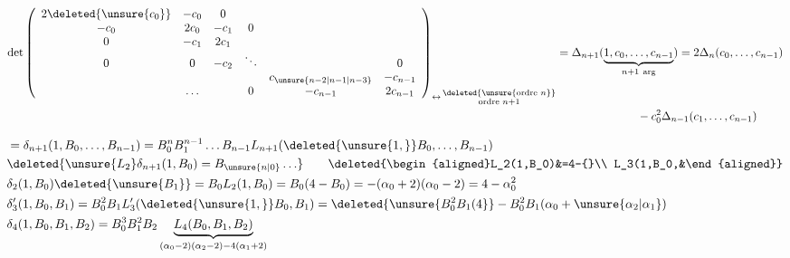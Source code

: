 \[
\begin{aligned}
\det\left(\begin{array}{cccccc}
2\deleted{\unsure{c_0}}&-c_0&0&&&\\
-c_0&2c_0&-c_1&0&&\\
0&-c_1&2c_1&&&\\
0&0&-c_2&\ddots&&0\\
&&&&c_{\unsure{n-2|n-1|n-3}}&-c_{n-1}\\
&\ldots&&0&-c_{n-1}&2c_{n-1}
\end{array}\right)_{\leftrightarrow\,\substack{\deleted{\unsure{\text{ordre }n}}\\\text{ordre }n+1}}
&=\Delta_{n+1}(\underbrace{1,c_0,\ldots,c_{n-1}}_{n+1\ \text{arg}})=2\Delta_n(c_0,\ldots,c_{n-1})\\
&\hspace{7em}-c_0^2\Delta_{n-1}(c_1,\ldots,c_{n-1})
\end{aligned}
\]

\[
\begin{aligned}
&=\delta_{n+1}(1,B_0,\ldots,B_{n-1})=B_0^n B_1^{n-1}\ldots B_{n-1}L_{n+1}(\deleted{\unsure{1,}}B_0,\ldots,B_{n-1})\\
&\deleted{\unsure{L_2}\delta_{n+1}(1,B_0)=B_{\unsure{n|0}}\ldots}
\qquad \deleted{\begin{aligned}L_2(1,B_0)&=4-{}\\ L_3(1,B_0,&\end{aligned}}\\
&\delta_2(1,B_0)\deleted{\unsure{B_1}}=B_0 L_2(1,B_0)=B_0(4-B_0)=-(\alpha_0+2)(\alpha_0-2)=4-\alpha_0^2\\
&\delta'_3(1,B_0,B_1)=B_0^2B_1L'_3(\deleted{\unsure{1,}}B_0,B_1)=\deleted{\unsure{B_0^2B_1(4}}-B_0^2B_1(\alpha_0+\unsure{\alpha_2|\alpha_1})\\
&\delta_4(1,B_0,B_1,B_2)=B_0^3B_1^2B_2\underbrace{L_4(B_0,B_1,B_2)}_{(\alpha_0-2)(\alpha_2-2)-4(\alpha_1+2)}
\end{aligned}
\]

